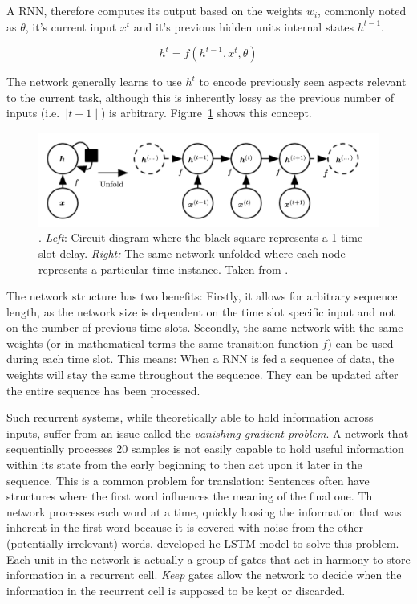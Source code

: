 A \ac{RNN}, therefore computes its output based on the weights $w_i$, commonly noted as $\theta$, it's current input
$x^t$ and it's previous hidden units internal states $h^{t-1}$.

\[
    h^t = f(h^{t-1}, x^t, \theta)
\]

The network generally learns to use $h^t$ to encode previously seen aspects relevant to the current task, although this
is inherently lossy as the previous number of inputs (i.e.\ $\mid t-1\mid$) is arbitrary. Figure~\ref{fig:rnn_concept}
shows this concept.

\begin{figure}[]
    \centering
    \includegraphics[width=0.8\linewidth]{img/rnn_concept.png}
    \caption[Recurrent Neural Network conceptualized]{. \emph{Left}: Circuit diagram where the black square represents a
        1 time slot delay. \emph{Right:} The same network unfolded where each node represents a particular time instance.
    Taken from \citet{Goodfellow-et-al-2016}.}
    \label{fig:rnn_concept}
\end{figure}

The network structure has two benefits: Firstly, it allows for arbitrary sequence length, as the network size is
dependent on the time slot specific input and not on the number of previous time slots. Secondly, the same network with
the same weights (or in mathematical terms the same transition function $f$) can be used during each time slot. This
means: When a \ac{RNN} is fed a sequence of data, the weights will stay the same throughout the sequence. They can be
updated after the entire sequence has been processed.

Such recurrent systems, while theoretically able to hold information across inputs, suffer from an issue called the
\emph{vanishing gradient problem}. A network that sequentially processes 20 samples is not easily capable to hold useful
information within its state from the early beginning to then act upon it later in the sequence. This is a common
problem for translation: Sentences often have structures where the first word influences the meaning of the final one.
Th network processes each word at a time, quickly loosing the information that was inherent in the first word because it
is covered with noise from the other (potentially irrelevant) words. \citet{Hochreiter:1997:LSM:1246443.1246450}
developed he \ac{LSTM} model to solve this problem. Each unit in the network is actually a group of gates that act in
harmony to store information in a recurrent cell. \emph{Keep} gates allow the network to decide when the information in
the recurrent cell is supposed to be kept or discarded.



